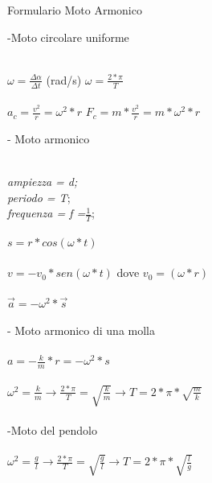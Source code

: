 \documentclass[a4paper]{article}
\begin{document}
\begin{center}
{\Huge Formulario Moto Armonico}
\vspace{0,75cm}
\end{center}
{\huge -Moto circolare uniforme}
\\
\\
\begin{Large}
\hspace* {1,5cm} $\omega = \frac{\Delta \alpha}{\Delta t} $ (rad/s)
\hspace {1,5cm} $\omega = \frac{2*\pi}{T}$
\\
\\
\hspace*{1,5cm} $a_{c} = \frac{v^{2}}{r} = \omega^{2}*r$
\hspace{1,5cm} $F_{c} = m*\frac{v^{2}}{r} = m*\omega^{2}*r $
\end{Large}
{\huge - Moto armonico}
\\
\\
\begin{Large}
\hspace* {0,75cm} \textit{ampiezza = d;}\\
\hspace*{0,75cm} \textit{periodo = T};\\
\hspace*{0,75cm}\textit{frequenza = f =$ \frac{1}{T} $};
\\
\\
\hspace*{1,5cm}$s = r * cos(\omega*t)$
\\
\\
\hspace*{1,5cm}$v = -v_{0} * sen(\omega * t)$ dove $v_{0} = (\omega * r)$
\\
\\
\hspace*{1,5cm}$\overrightarrow{a} = -\omega^{2}*\overrightarrow{s} $
\\
\\
{\huge - Moto armonico di una molla}
\\
\\
\hspace*{1,5cm}$a = -\frac{k}{m}*r = -\omega^{2}*s$
\\
\\
\hspace*{1,5cm}$\omega^{2} = \frac{k}{m} \rightarrow \frac{2*\pi}{T} = \sqrt{\frac{k}{m}} \rightarrow T= 2*\pi*\sqrt{\frac{m}{k}}$
\\
\\
{\huge -Moto del pendolo}
\\
\\
\hspace*{1,5cm}$\omega^{2} = \frac{g}{l} \rightarrow \frac{2*\pi}{T} = \sqrt{\frac{g}{l}} \rightarrow T= 2*\pi*\sqrt{\frac{l}{g}}$
\end{Large}
\end{document}
